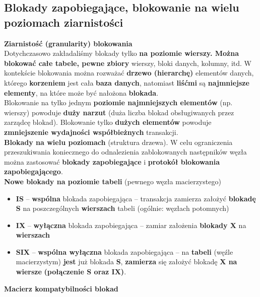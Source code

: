 \documentclass[a4paper]{article}
\begin{document}
\subsection{Blokady zapobiegające, blokowanie na wielu poziomach ziarnistości}
 \textbf{Ziarnistość (granularity) blokowania}\\
 Dotychczasowo zakładaliśmy blokady tylko \textbf{na poziomie wierszy. Można blokować całe tabele, pewne zbiory} wierszy, bloki danych, kolumny, itd. W kontekście blokowania można rozważać \textbf{drzewo (hierarchę)} elementów danych, którego \textbf{korzeniem} jest cała \textbf{baza danych}, natomiast \textbf{liśćmi} są \textbf{najmniejsze elementy}, na które może być nałożona \textbf{blokada}.\\
 
 Blokowanie na tylko jednym \textbf{poziomie najmniejszych elementów} (np. wierszy) powoduje \textbf{duży narzut} (duża liczba blokad obsługiwanych przez zarządcę blokad). Blokowanie tylko \textbf{dużych elementów} powoduje \textbf{zmniejszenie wydajności współbieżnych} transakcji.\\
 
 \textbf{Blokady na wielu poziomach} (struktura drzewa). W celu ograniczenia przeszukiwania koniecznego do odnalezienia zablokowanych następników węzła można zastosować \textbf{blokady zapobiegające} i \textbf{protokół blokowania zapobiegającego}.\\
 
 \textbf{Nowe blokady na poziomie tabeli} (pewnego węzła macierzystego)
\begin{itemize}
    \item \textbf{IS} – \textbf{wspólna} blokada zapobiegająca – transakcja zamierza założyć \textbf{blokadę S} na poszczególnych \textbf{wierszach} tabeli (ogólnie: węzłach potomnych)
    \item \textbf{IX} – \textbf{wyłączna} blokada zapobiegająca – zamiar założenia \textbf{blokady X} na \textbf{wierszach}
    \item \textbf{SIX} – \textbf{wspólna wyłączna} blokada zapobiegająca – na \textbf{tabeli} (węźle macierzystym) \textbf{jest} już blokada \textbf{S}, \textbf{zamierza} się założyć blokadę \textbf{X na wiersze} \textbf{(połączenie S oraz IX)}.
\end{itemize}

\textbf{Macierz kompatybilności blokad}
\end{document}
